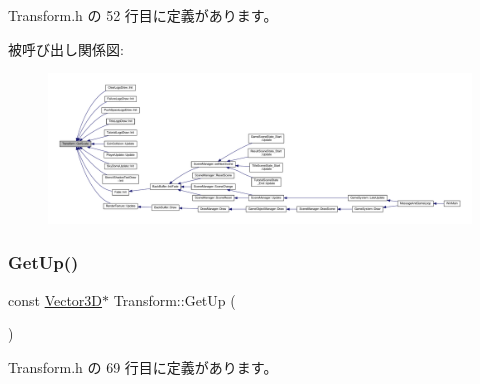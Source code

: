  Transform.\+h の 52 行目に定義があります。

被呼び出し関係図\+:
\nopagebreak
\begin{figure}[H]
\begin{center}
\leavevmode
\includegraphics[width=350pt]{class_transform_accedf33a4ddbdcf2d4fc4274f85bf818_icgraph}
\end{center}
\end{figure}
\mbox{\label{class_transform_a9f5700481ae42556f763726947feaf36}} 
\subsubsection{\texorpdfstring{Get\+Up()}{GetUp()}}
{\footnotesize\ttfamily const \mbox{\hyperlink{class_vector3_d}{Vector3D}}$\ast$ Transform\+::\+Get\+Up (\begin{DoxyParamCaption}{ }\end{DoxyParamCaption})\hspace{0.3cm}{\ttfamily [inline]}}



 Transform.\+h の 69 行目に定義があります。

